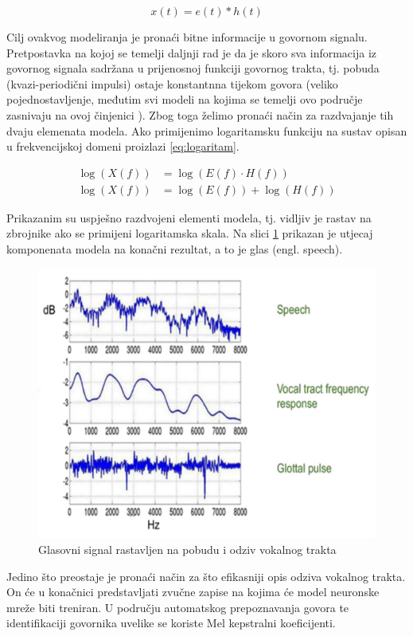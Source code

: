\begin{equation}
    \label{eq:govor_vremenska}
    x(t) = e(t) \ast h(t)
\end{equation}

Cilj ovakvog modeliranja je pronaći bitne informacije u govornom signalu. Pretpostavka na
kojoj se temelji daljnji rad je da je skoro sva informacija iz govornog signala sadržana
u prijenosnoj funkciji govornog trakta, tj. pobuda (kvazi-periodični impulsi) ostaje
konstantnna tijekom govora (veliko pojednostavljenje, međutim svi modeli na kojima
se temelji ovo područje zasnivaju na ovoj činjenici \cite{multiplier, emotion, sidhu2024mfcc}).
Zbog toga želimo pronaći način za 
razdvajanje tih dvaju elemenata modela. Ako primijenimo logaritamsku funkciju na
sustav opisan u frekvencijskoj domeni proizlazi \ref{eq:logaritam}.

\begin{equation}
    \label{eq:logaritam}
    \begin{aligned}
        \log(X(f)) &= \log(E(f) \cdot H(f)) \\
        \log(X(f)) &= \log(E(f)) + \log(H(f))
    \end{aligned}
\end{equation}

Prikazanim su uspješno razdvojeni elementi modela, tj. vidljiv je rastav na zbrojnike
ako se primijeni logaritamska skala. Na slici \ref{pic:rastav} prikazan je utjecaj
komponenata modela na konačni rezultat, a to je glas (engl. speech). 

\begin{figure}[htb]
    \centering
    \includegraphics[width=0.6\linewidth]{Chapters/struktura_sustava/generiranje_znacajki/log.png} 
    \caption{Glasovni signal rastavljen na pobudu i odziv vokalnog trakta \cite{sidhu2024mfcc}}
    \label{pic:rastav}
\end{figure}

Jedino što preostaje je pronaći način za što efikasniji opis odziva vokalnog trakta. On će
u konačnici predstavljati zvučne zapise na kojima će model neuronske mreže biti treniran.
U području automatskog prepoznavanja govora te identifikaciji govornika uvelike se koriste
Mel kepstralni koeficijenti.


